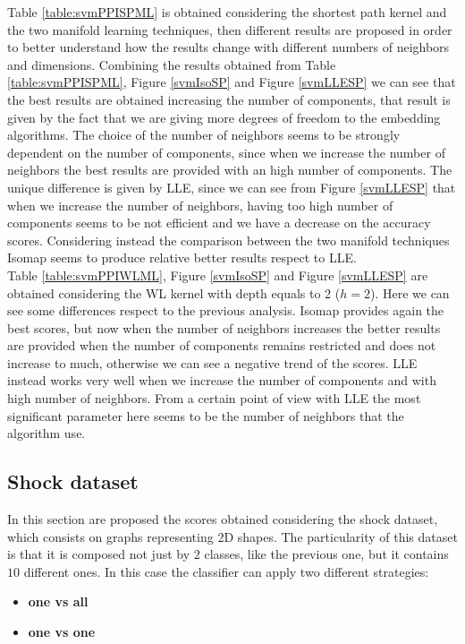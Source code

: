 \documentclass[11pt,a4paper]{article}
\begin{document}
Table \ref{table:svmPPISPML} is obtained considering the shortest path kernel and the two manifold learning techniques, then different results are proposed in order to better understand how the results change with different numbers of neighbors and dimensions. Combining the results obtained from Table \ref{table:svmPPISPML}, Figure \ref{svmIsoSP} and Figure \ref{svmLLESP} we can see that the best results are obtained increasing the number of components, that result is given by the fact that we are giving more degrees of freedom to the embedding algorithms. The choice of the number of neighbors seems to be strongly dependent on the number of components, since when we increase the number of neighbors the best results are provided with an high number of components. The unique difference is given by LLE, since we can see from  Figure \ref{svmLLESP} that when we increase the number of neighbors, having too high number of components seems to be not efficient and we have a decrease on the accuracy scores. Considering instead the comparison between the two manifold techniques Isomap seems to produce relative better results respect to LLE.\\
Table \ref{table:svmPPIWLML}, Figure \ref{svmIsoSP} and Figure \ref{svmLLESP} are obtained considering the WL kernel with depth equals to 2 ($h= 2$). Here we can see some differences respect to the previous analysis. Isomap provides again the best scores, but now when the number of neighbors increases the better results are provided when the number of components remains restricted and does not increase to much, otherwise we can see a negative trend of the scores. LLE instead works very well when we increase the number of components and with high number of neighbors. From a certain point of view with LLE the most significant parameter here seems to be the number of neighbors that the algorithm use.

\subsection{Shock dataset}
In this section are proposed the scores obtained considering the shock dataset, which consists on graphs representing 2D shapes. The particularity of this dataset is that it is composed not just by $2$ classes, like the previous one, but it contains $10$ different ones. In this case the classifier can apply two different strategies:
\begin{itemize}
	\item \textbf{one vs all}
	\item \textbf{one vs one}
\end{itemize}
\end{document}
